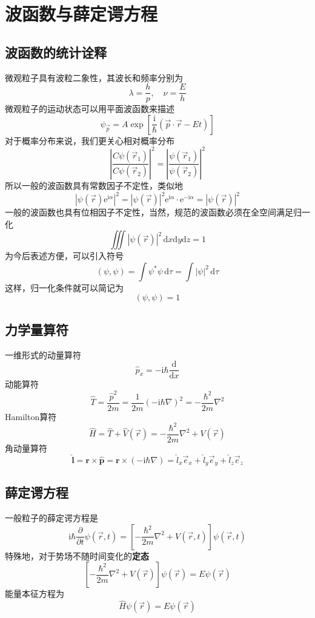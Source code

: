 \section{波函数与薛定谔方程}

\subsection{波函数的统计诠释}
微观粒子具有波粒二象性，其波长和频率分别为
$$
    \lambda=\frac{h}{p}, \quad \nu=\frac{E}{h}
$$
微观粒子的运动状态可以用平面波函数来描述
$$
    \psi_{\vec{p}}=A\exp\left[\frac{\mathrm{i}}{\hbar}\left(\vec{p}\cdot\vec{r}-Et\right)\right]
$$
对于概率分布来说，我们更关心相对概率分布
$$
    \left|\frac{C\psi(\vec{r}_1)}{C\psi(\vec{r}_2)}\right|^2 = \left|\frac{\psi(\vec{r}_1)}{\psi(\vec{r}_2)}\right|^2
$$
所以一般的波函数具有常数因子不定性，类似地
$$
    \left|\psi(\vec{r})\mathrm{e}^{\mathrm{i}\alpha}\right|^2
    = |\psi(\vec{r})|^2\mathrm{e}^{\mathrm{i}\alpha}\cdot\mathrm{e}^{-\mathrm{i}\alpha}
    = \left|\psi(\vec{r})\right|^2
$$
一般的波函数也具有位相因子不定性，当然，规范的波函数必须在全空间满足归一化
$$
    \iiint\left|\psi(\vec{r})\right|^2\,\mathrm{d}x\mathrm{d}y\mathrm{d}z=1
$$
为今后表述方便，可以引入符号
$$
    (\psi, \psi)=\int\psi^*\psi\,\mathrm{d}\tau=\int|\psi|^2\,\mathrm{d}\tau
$$
这样，归一化条件就可以简记为
$$
    (\psi, \psi)=1
$$

\subsection{力学量算符}
一维形式的动量算符
$$
    \hat{p}_x = -\mathrm{i}\hbar\frac{\mathrm{d}}{\mathrm{d}x}
$$
动能算符
$$
    \hat{T}=\frac{\hat{p}^2}{2m}
    =\frac{1}{2m}\left(-\mathrm{i}\hbar\nabla\right)^2
    =-\frac{\hbar^2}{2m}\nabla^2
$$
Hamilton算符
$$
    \hat{H}=\hat{T}+\hat{V}(\vec{r})=-\frac{\hbar^2}{2m}\nabla^2+V(\vec{r})
$$
角动量算符
$$
    \hat{\boldsymbol{l}}
    = \boldsymbol{r} \times \hat{\boldsymbol{p}}
    = \boldsymbol{r} \times (-\mathrm{i}\hbar\nabla)
    = \hat{l}_x\vec{e}_x + \hat{l}_y\vec{e}_y + \hat{l}_z\vec{e}_z
$$

\subsection{薛定谔方程}
一般粒子的薛定谔方程是
$$
    \mathrm{i}\hbar\frac{\partial }{\partial t}\psi(\vec{r}, t) = \left[-\frac{\hbar^2}{2m}\nabla^2 + V(\vec{r}, t)\right]\psi(\vec{r}, t)
$$
特殊地，对于势场不随时间变化的\textbf{定态}
$$
    \left[-\frac{\hbar^2}{2m}\nabla^2 + V(\vec{r})\right]\psi(\vec{r}) = E\psi(\vec{r})
$$
能量本征方程为
$$
    \hat{H}\psi(\vec{r}) =E\psi(\vec{r})
$$


